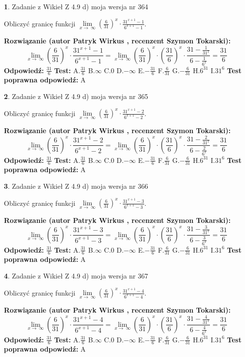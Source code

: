 \documentclass[12pt, a4paper]{article}
\theoremstyle{definition} %
\newtheorem{zad}{}
\newcommand{\zadStart}[1]{\begin{zad}#1\newline}
\newcommand{\zadStop}{\end{zad}}
\newcommand{\rozwStart}[2]{\noindent \textbf{Rozwiązanie (autor #1 , recenzent #2): }\newline}
\newcommand{\rozwStop}{\newline}
\newcommand{\odpStart}{\noindent \textbf{Odpowiedź:}\newline}
\newcommand{\odpStop}{\newline}
\newcommand{\testStart}{\noindent \textbf{Test:}\newline}
\newcommand{\testStop}{\newline}
\newcommand{\kluczStart}{\noindent \textbf{Test poprawna odpowiedź:}\newline}
\newcommand{\kluczStop}{\newline}
\begin{document}
\zadStart{Zadanie z Wikieł Z 4.9 d) moja wersja nr 364}


Obliczyć granicę funkcji  $\lim\limits_{x\to\ \infty}(\frac{6}{31})^{x}\cdot\frac{31^{x+1}-1}{6^{x+1}-1}$.
\zadStop
\rozwStart{Patryk Wirkus}{Szymon Tokarski}
$$\lim\limits_{x\to\ \infty}(\frac{6}{31})^{x}\cdot\frac{31^{x+1}-1}{6^{x+1}-1}=\lim\limits_{x\to\ \infty}(\frac{6}{31})^{x}\cdot(\frac{31}{6})^{x} \cdot \frac{31-\frac{1}{31^{x}}}{6-\frac{1}{6^{x}}} = \frac{31}{6}$$
\rozwStop
\odpStart
$\frac{31}{6}$
\odpStop
\testStart
A.$\frac{31}{6}$ B.$\infty$ C.$0$ D.$-\infty$ E.$-\frac{31}{6}$
F.$\frac{6}{31}$ G.$-\frac{6}{31}$
H.$6^{31}$
I.$31^{6}$
\testStop
\kluczStart
A
\kluczStop



\zadStart{Zadanie z Wikieł Z 4.9 d) moja wersja nr 365}


Obliczyć granicę funkcji  $\lim\limits_{x\to\ \infty}(\frac{6}{31})^{x}\cdot\frac{31^{x+1}-2}{6^{x+1}-2}$.
\zadStop
\rozwStart{Patryk Wirkus}{Szymon Tokarski}
$$\lim\limits_{x\to\ \infty}(\frac{6}{31})^{x}\cdot\frac{31^{x+1}-2}{6^{x+1}-2}=\lim\limits_{x\to\ \infty}(\frac{6}{31})^{x}\cdot(\frac{31}{6})^{x} \cdot \frac{31-\frac{2}{31^{x}}}{6-\frac{2}{6^{x}}} = \frac{31}{6}$$
\rozwStop
\odpStart
$\frac{31}{6}$
\odpStop
\testStart
A.$\frac{31}{6}$ B.$\infty$ C.$0$ D.$-\infty$ E.$-\frac{31}{6}$
F.$\frac{6}{31}$ G.$-\frac{6}{31}$
H.$6^{31}$
I.$31^{6}$
\testStop
\kluczStart
A
\kluczStop



\zadStart{Zadanie z Wikieł Z 4.9 d) moja wersja nr 366}


Obliczyć granicę funkcji  $\lim\limits_{x\to\ \infty}(\frac{6}{31})^{x}\cdot\frac{31^{x+1}-3}{6^{x+1}-3}$.
\zadStop
\rozwStart{Patryk Wirkus}{Szymon Tokarski}
$$\lim\limits_{x\to\ \infty}(\frac{6}{31})^{x}\cdot\frac{31^{x+1}-3}{6^{x+1}-3}=\lim\limits_{x\to\ \infty}(\frac{6}{31})^{x}\cdot(\frac{31}{6})^{x} \cdot \frac{31-\frac{3}{31^{x}}}{6-\frac{3}{6^{x}}} = \frac{31}{6}$$
\rozwStop
\odpStart
$\frac{31}{6}$
\odpStop
\testStart
A.$\frac{31}{6}$ B.$\infty$ C.$0$ D.$-\infty$ E.$-\frac{31}{6}$
F.$\frac{6}{31}$ G.$-\frac{6}{31}$
H.$6^{31}$
I.$31^{6}$
\testStop
\kluczStart
A
\kluczStop



\zadStart{Zadanie z Wikieł Z 4.9 d) moja wersja nr 367}


Obliczyć granicę funkcji  $\lim\limits_{x\to\ \infty}(\frac{6}{31})^{x}\cdot\frac{31^{x+1}-4}{6^{x+1}-4}$.
\zadStop
\rozwStart{Patryk Wirkus}{Szymon Tokarski}
$$\lim\limits_{x\to\ \infty}(\frac{6}{31})^{x}\cdot\frac{31^{x+1}-4}{6^{x+1}-4}=\lim\limits_{x\to\ \infty}(\frac{6}{31})^{x}\cdot(\frac{31}{6})^{x} \cdot \frac{31-\frac{4}{31^{x}}}{6-\frac{4}{6^{x}}} = \frac{31}{6}$$
\rozwStop
\odpStart
$\frac{31}{6}$
\odpStop
\testStart
A.$\frac{31}{6}$ B.$\infty$ C.$0$ D.$-\infty$ E.$-\frac{31}{6}$
F.$\frac{6}{31}$ G.$-\frac{6}{31}$
H.$6^{31}$
I.$31^{6}$
\testStop
\kluczStart
A
\kluczStop
\end{document}
